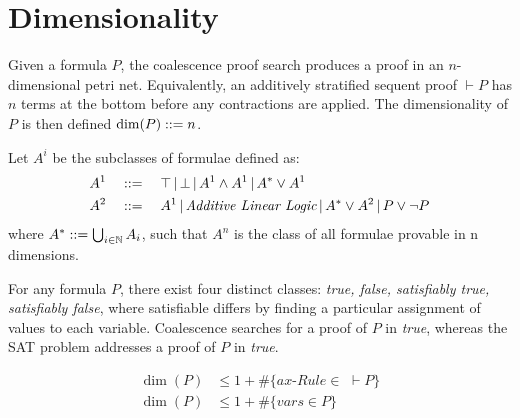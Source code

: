 \section{Dimensionality}
    
    \begin{definition*}[Dimensionality]
        Given a formula $P$, the coalescence proof search produces a proof in an $n$-dimensional petri net.
        Equivalently, an additively stratified sequent proof $\vdash P$ has $n$ terms at the bottom before any contractions are applied.
        The dimensionality of $P$ is then defined $\dim(P) ::= n$.
    \end{definition*}

    \begin{examples}
    \end{examples}


    \begin{definition*}
        Let $A^i$ be the subclasses of formulae defined as:
        \begin{align*}
            A^1 \quad &::= \quad \top \,|\, \bot \,|\, A^1 \wedge A^1 \,|\, A^* \vee A^1 \\
            A^2 \quad &::= \quad A^1 \,|\, \textit{Additive Linear Logic} \,|\, A^* \vee A^2 \,|\, P \vee \neg P
        \end{align*}
        where $A^* ::= \bigcup_{i \in \mathbb{N}} A_i$, such that $A^n$ is the class of all formulae provable in n dimensions.
    \end{definition*}


    \begin{remark*}
        For any formula $P$, there exist four distinct classes: \textit{true, false, satisfiably true, satisfiably false}, where satisfiable differs by finding a particular assignment of values to each variable.
        Coalescence searches for a proof of $P$ in \textit{true}, whereas the SAT problem addresses a proof of $P$ in \textit{true}.
    \end{remark*}
    
    
    \begin{proposition*}
        \begin{align*}
            \dim(P) &\leq 1 + \#\{ax\textit{-Rule} \in \,\, \vdash P\} \\
            \dim(P) &\leq 1 + \#\{vars \in P\}
        \end{align*}
    \end{proposition*}

